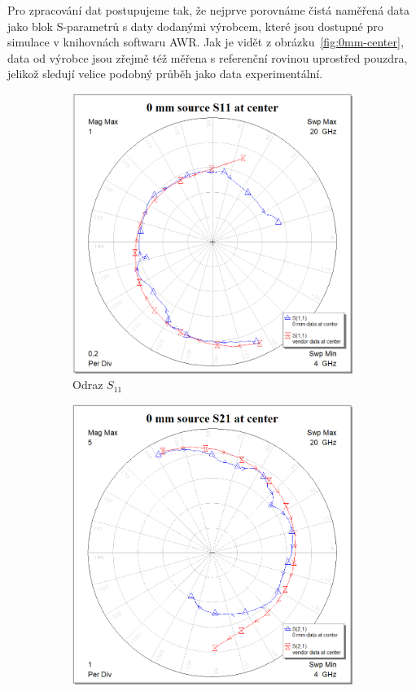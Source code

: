 \documentclass[11pt,a4paper]{article}
\begin{document}
Pro zpracování dat postupujeme tak, že nejprve porovnáme čistá naměřená data jako blok S-parametrů s daty dodanými výrobcem, které jsou dostupné pro simulace v knihovnách softwaru AWR. Jak je vidět z obrázku~\ref{fig:0mm-center}, data od výrobce jsou zřejmě též měřena s referenční rovinou uprostřed pouzdra, jelikož sledují velice podobný průběh jako data experimentální.
\begin{figure}[!ht]
    \centering
\begin{subfigure}{0.45\textwidth}
    \centering
    \includegraphics[width=\textwidth]{src/0mm-S11-center.png}
    \caption{Odraz $S_{11}$}
\end{subfigure}
\begin{subfigure}{0.45\textwidth}
    \centering
    \includegraphics[width=\textwidth]{src/0mm-S21-center.png}

\end{subfigure}
\end{figure}
\end{document}
